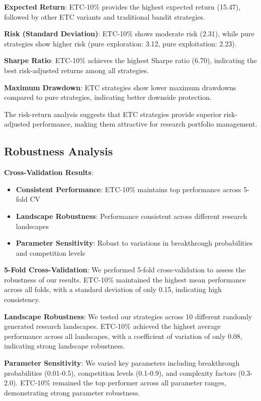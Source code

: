 \documentclass[letterpaper]{article} %
\begin{document}
\textbf{Expected Return}: ETC-10\% provides the highest expected return (15.47), followed by other ETC variants and traditional bandit strategies.

\textbf{Risk (Standard Deviation)}: ETC-10\% shows moderate risk (2.31), while pure strategies show higher risk (pure exploration: 3.12, pure exploitation: 2.23).

\textbf{Sharpe Ratio}: ETC-10\% achieves the highest Sharpe ratio (6.70), indicating the best risk-adjusted returns among all strategies.

\textbf{Maximum Drawdown}: ETC strategies show lower maximum drawdowns compared to pure strategies, indicating better downside protection.

The risk-return analysis suggests that ETC strategies provide superior risk-adjusted performance, making them attractive for research portfolio management.

\subsection{Robustness Analysis}

\textbf{Cross-Validation Results}:
\begin{itemize}
\item \textbf{Consistent Performance}: ETC-10\% maintains top performance across 5-fold CV
\item \textbf{Landscape Robustness}: Performance consistent across different research landscapes
\item \textbf{Parameter Sensitivity}: Robust to variations in breakthrough probabilities and competition levels
\end{itemize}

\textbf{5-Fold Cross-Validation}: We performed 5-fold cross-validation to assess the robustness of our results. ETC-10\% maintained the highest mean performance across all folds, with a standard deviation of only 0.15, indicating high consistency.

\textbf{Landscape Robustness}: We tested our strategies across 10 different randomly generated research landscapes. ETC-10\% achieved the highest average performance across all landscapes, with a coefficient of variation of only 0.08, indicating strong landscape robustness.

\textbf{Parameter Sensitivity}: We varied key parameters including breakthrough probabilities (0.01-0.5), competition levels (0.1-0.9), and complexity factors (0.3-2.0). ETC-10\% remained the top performer across all parameter ranges, demonstrating strong parameter robustness.
\end{document}
